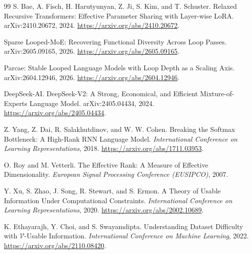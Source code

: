 \documentclass[11pt]{article}
\begin{document}
\begin{thebibliography}{99}
S. Bae, A. Fisch, H. Harutyunyan, Z. Ji, S. Kim, and T. Schuster.
\newblock Relaxed Recursive Transformers: Effective Parameter Sharing with Layer-wise LoRA.
\newblock arXiv:2410.20672, 2024.
\newblock \url{https://arxiv.org/abs/2410.20672}.

Sparse Looped-MoE: Recovering Functional Diversity Across Loop Passes.
\newblock arXiv:2605.09165, 2026.
\newblock \url{https://arxiv.org/abs/2605.09165}.

Parcae: Stable Looped Language Models with Loop Depth as a Scaling Axis.
\newblock arXiv:2604.12946, 2026.
\newblock \url{https://arxiv.org/abs/2604.12946}.

DeepSeek-AI.
\newblock DeepSeek-V2: A Strong, Economical, and Efficient Mixture-of-Experts Language Model.
\newblock arXiv:2405.04434, 2024.
\newblock \url{https://arxiv.org/abs/2405.04434}.

Z. Yang, Z. Dai, R. Salakhutdinov, and W. W. Cohen.
\newblock Breaking the Softmax Bottleneck: A High-Rank RNN Language Model.
\newblock \emph{International Conference on Learning Representations}, 2018.
\newblock \url{https://arxiv.org/abs/1711.03953}.

O. Roy and M. Vetterli.
\newblock The Effective Rank: A Measure of Effective Dimensionality.
\newblock \emph{European Signal Processing Conference (EUSIPCO)}, 2007.

Y. Xu, S. Zhao, J. Song, R. Stewart, and S. Ermon.
\newblock A Theory of Usable Information Under Computational Constraints.
\newblock \emph{International Conference on Learning Representations}, 2020.
\newblock \url{https://arxiv.org/abs/2002.10689}.

K. Ethayarajh, Y. Choi, and S. Swayamdipta.
\newblock Understanding Dataset Difficulty with \(\mathcal{V}\)-Usable Information.
\newblock \emph{International Conference on Machine Learning}, 2022.
\newblock \url{https://arxiv.org/abs/2110.08420}.

\end{thebibliography}
\end{document}
